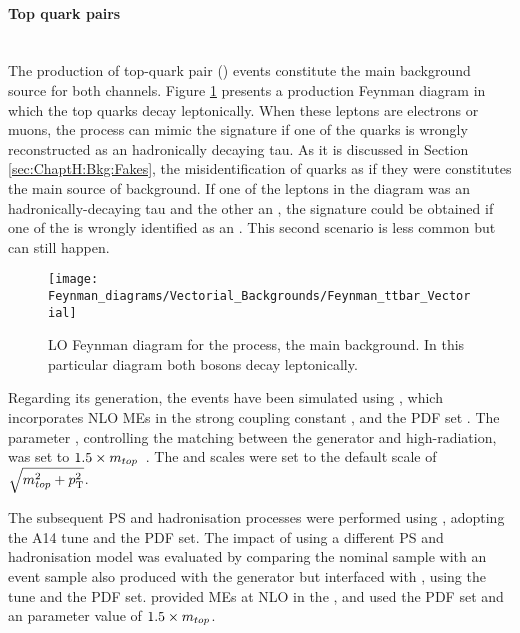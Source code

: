 
\paragraph{Top quark pairs}\mbox{}\\
The production of top-quark pair (\ttbar) events constitute the main background source
for both \dileptau channels. Figure \ref{fig:tHq:Backgrounds:Feynman_ttbar} presents
a \ttbar production Feynman diagram in which the top quarks decay leptonically. 
When these leptons are electrons or muons, the \ttbar process can mimic the
\dilepOStau signature if one of the quarks is wrongly reconstructed as an hadronically
decaying tau. As it is discussed in Section \ref{sec:ChaptH:Bkg:Fakes}, the misidentification of quarks as if they were \tauhad constitutes the main source of background.
If one of the leptons in the \ttbar diagram was an hadronically-decaying tau and the other an \emu, the 
\dileptau signature could be obtained if one of the \bjets is wrongly identified as an \emu. This second scenario is less common but can still happen.

\begin{figure}[htbp!]
\centering
\texttt{[image: Feynman\_diagrams/Vectorial\_Backgrounds/Feynman\_ttbar\_Vectorial]}
\caption{LO Feynman diagram for the \ttbar process, the main background. 
	In this particular diagram both \PW bosons decay leptonically.}
\label{fig:tHq:Backgrounds:Feynman_ttbar}
\end{figure}


Regarding its generation, the \ttbar events have been simulated using 
\POWHEGBOX[v2] \cite{Frixione:2007nw, Nason:2004rx, Frixione:2007vw, Alioli:2010xd},
 which incorporates NLO MEs in the strong coupling constant \alphas, and the 
 \NNPDF[3.0nlo] PDF set \cite{Ball:2014uwa}. The parameter \hdamp, controlling 
 the matching between the \POWHEG generator and high-\pT radiation, was set to 
 $1.5\times m_{top}$~\cite{ATL-PHYS-PUB-2016-020}.
The \muR  and \muF scales were set to the default scale of \(\sqrt{m_{top}^{2} + p_{\text{T}}^{2}}\).

The subsequent PS and hadronisation processes were performed using \PYTHIA[8.230], 
adopting the A14 tune and the \NNPDF[2.3lo] PDF set. %
The impact of using a different PS and hadronisation model was evaluated
by comparing the nominal \ttbar sample with an event sample also produced with the
\POWHEGBOX[v2] generator but interfaced with \HERWIG[7.13], using the
\HERWIG[7.1] tune and the
\MMHT[lo] PDF set. \POWHEGBOX provided MEs at NLO in the \alphas, and used the
\NNPDF[3.0nlo] PDF set and
an \hdamp parameter value of $1.5\times m_{top}$.



